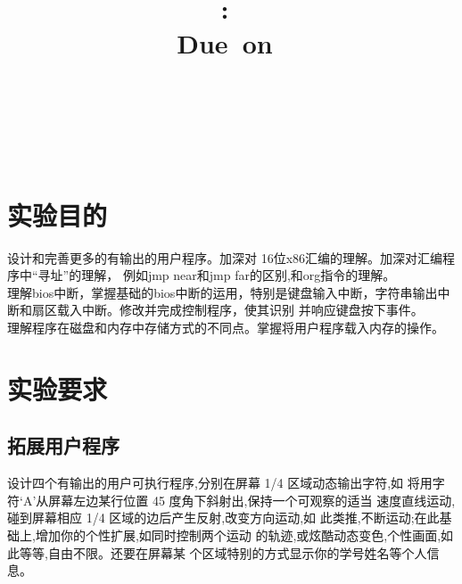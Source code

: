 \documentclass[a4paper]{article}
\title{
\vspace{2in}
\textmd{\textbf{\hmwkClass:\ \hmwkTitle}}\\
\normalsize\vspace{0.1in}\small{Due\ on\ \hmwkDueDate}\\
\vspace{0.1in}\large{\textit{\hmwkClassInstructor\ \hmwkClassTime}}
\vspace{3in}
}
\author{\textbf{\LARGE{\hmwkAuthorName}} \\ \\ \textbf{\LARGE{\hmwkAuthorId}}}
\date{} %
\newcommand{\codev}[1]{\textsf{#1}}
\begin{document}

\maketitle




\renewcommand{\contentsname}{Content} %
\newpage
\tableofcontents
{}
\newpage



\section{实验目的}
设计和完善更多的有输出的用户程序。加深对 16位x86汇编的理解。加深对汇编程序中``寻址''的理解，
例如\codev{jmp near}和\codev{jmp far}的区别,和\codev{org}指令的理解。\\

理解bios中断，掌握基础的bios中断的运用，特别是键盘输入中断，字符串输出中断和扇区载入中断。修改并完成控制程序，使其识别
并响应键盘按下事件。\\

理解程序在磁盘和内存中存储方式的不同点。掌握将用户程序载入内存的操作。
\section{实验要求}
    \subsection{拓展用户程序}
    设计四个有输出的用户可执行程序,分别在屏幕 1/4 区域动态输出字符,如
    将用字符`A'从屏幕左边某行位置 45 度角下斜射出,保持一个可观察的适当
    速度直线运动,碰到屏幕相应 1/4 区域的边后产生反射,改变方向运动,如
    此类推,不断运动;在此基础上,增加你的个性扩展,如同时控制两个运动
    的轨迹,或炫酷动态变色,个性画面,如此等等,自由不限。还要在屏幕某
    个区域特别的方式显示你的学号姓名等个人信息。
\end{document}
